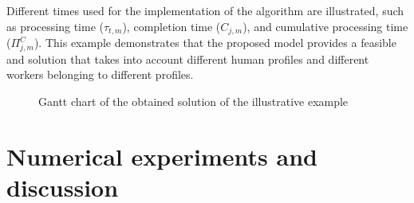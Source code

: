 \documentclass[review,12pt, 3p, times]{elsarticle}
\begin{document}
Different times used for the implementation of the algorithm are illustrated, such as processing time ($\tau_{t,m}$), completion time ($C_{j,m}$), and cumulative processing time ($\Pi^C_{j,m}$). This example demonstrates that the proposed model provides a feasible and  solution that takes into account different human profiles and different workers belonging to different profiles.  
					
\begin{figure}[htbp]
	\centering
	\caption{Gantt chart of the obtained solution of the illustrative example}
	\label{fig:Ex_p4}
\end{figure}
									
\section{Numerical experiments and discussion}\label{sec:Exp_dis}
\end{document}
